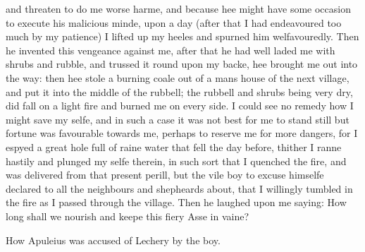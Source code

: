 and threaten to do me worse harme, and because hee might have some occasion to
execute his malicious minde, upon a day (after that I had endeavoured too much
by my patience) I lifted up my heeles and spurned him welfavouredly. Then he
invented this vengeance against me, after that he had well laded me with shrubs
and rubble, and trussed it round upon my backe, hee brought me out into the
way: then hee stole a burning coale out of a mans house of the next village,
and put it into the middle of the rubbell; the rubbell and shrubs being very
dry, did fall on a light fire and burned me on every side. I could see no
remedy how I might save my selfe, and in such a case it was not best for me to
stand still but fortune was favourable towards me, perhaps to reserve me for
more dangers, for I espyed a great hole full of raine water that fell the day
before, thither I ranne hastily and plunged my selfe therein, in such sort that
I quenched the fire, and was delivered from that present perill, but the vile
boy to excuse himselfe declared to all the neighbours and shepheards about,
that I willingly tumbled in the fire as I passed through the village. Then he
laughed upon me saying: How long shall we nourish and keepe this fiery Asse in
vaine?


How Apuleius was accused of Lechery by the boy.

